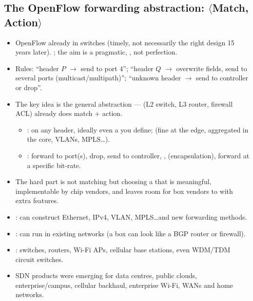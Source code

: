 \subsection{The OpenFlow forwarding abstraction: $\langle$Match, Action$\rangle$}
\begin{itemize}
\item OpenFlow  already in switches (timely, not necessarily the right design 15 years later). ; the aim is a pragmatic, , not perfection.
\item Rules: ``header $P$ $\to$ send to port 4''; ``header $Q$ $\to$ overwrite fields, send to several ports (multicast/multipath)''; ``unknown header $\to$ send to controller or drop''.
\item The key idea is the general  abstraction ---  (L2 switch, L3 router, firewall ACL) already does match + action.
\begin{itemize}
\item {}: on any header, ideally even a  you define;  (fine at the edge, aggregated in the core, VLANs, MPLS\ldots).
\item {}: forward to port(s), drop, send to controller, ,  (encapsulation), forward at a specific bit-rate.
\end{itemize}
\item The hard part is not matching but choosing a  that is meaningful, implementable by chip vendors, and leaves room for box vendors to  with extra features.
\end{itemize}
\begin{itemize}
\item {}: can construct Ethernet, IPv4, VLAN, MPLS\ldots and new forwarding methods.
\item {}: can run in existing networks (a box can look like a BGP router or firewall).
\item {}: switches, routers, Wi-Fi APs, cellular base stations, even WDM/TDM circuit switches.
\item SDN products were emerging for data centres, public clouds, enterprise/campus, cellular backhaul, enterprise Wi-Fi, WANs and home networks.
\end{itemize}

